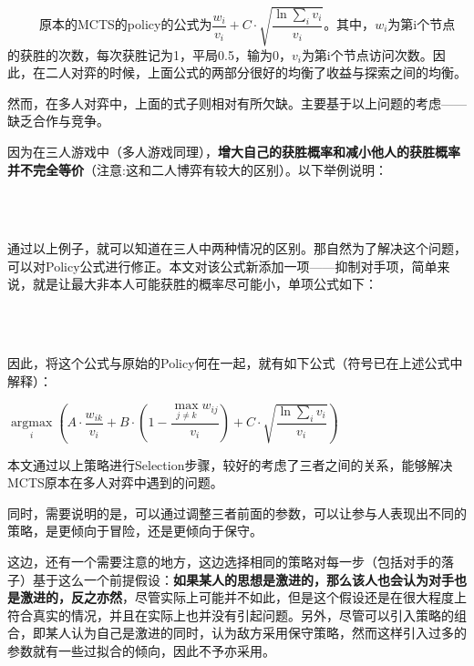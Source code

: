 \documentclass[9pt,twocolumn,twoside]{osajnl}
\begin{document}
\begin{adjustwidth}{2em}{}
\ \ \ \ \ 原本的MCTS的policy的公式为$\dfrac{w_i}{v_i}+C\cdot\sqrt{\dfrac{\ln{\sum_{i}v_i}}{v_i}}$。其中，$w_i$为第i个节点的获胜的次数，每次获胜记为1，平局0.5，输为0，$v_i$为第i个节点访问次数。因此，在二人对弈的时候，上面公式的两部分很好的均衡了收益与探索之间的均衡。

然而，在多人对弈中，上面的式子则相对有所欠缺。主要基于以上问题的考虑——缺乏合作与竞争。

因为在三人游戏中（多人游戏同理），\textbf{增大自己的获胜概率和减小他人的获胜概率并不完全等价}（注意:这和二人博弈有较大的区别）。以下举例说明：

\



\ \\


通过以上例子，就可以知道在三人中两种情况的区别。那自然为了解决这个问题，可以对Policy公式进行修正。本文对该公式新添加一项——抑制对手项，简单来说，就是让最大非本人可能获胜的概率尽可能小，单项公式如下：

\


\ \\

因此，将这个公式与原始的Policy何在一起，就有如下公式（符号已在上述公式中解释）：

$\mathop{argmax}\limits_i(A\cdot \dfrac{w_{ik}}{v_i}+B\cdot(1-\dfrac{\max\limits_{j\neq k}w_{ij}}{v_i})+C\cdot\sqrt{\dfrac{\ln{\sum_{i}v_i}}{v_i}})$

本文通过以上策略进行Selection步骤，较好的考虑了三者之间的关系，能够解决MCTS原本在多人对弈中遇到的问题。

同时，需要说明的是，可以通过调整三者前面的参数，可以让参与人表现出不同的策略，是更倾向于冒险，还是更倾向于保守。

这边，还有一个需要注意的地方，这边选择相同的策略对每一步（包括对手的落子）基于这么一个前提假设：\textbf{如果某人的思想是激进的，那么该人也会认为对手也是激进的，反之亦然}，尽管实际上可能并不如此，但是这个假设还是在很大程度上符合真实的情况，并且在实际上也并没有引起问题。另外，尽管可以引入策略的组合，即某人认为自己是激进的同时，认为敌方采用保守策略，然而这样引入过多的参数就有一些过拟合的倾向，因此不予亦采用。
\end{adjustwidth}
\end{document}
